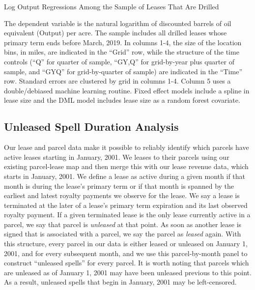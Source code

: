\begin{appendices}
	\begin{table}[H]
	\begin{center}
	\begin{threeparttable}
		\caption{Log Output Regressions Among the Sample of Leases That Are Drilled}\label{tab:outputconddrilled}
		 \small
			             
			\footnotesize
			\begin{tablenotes}
				\item The dependent variable is the natural logarithm of discounted barrels of oil equivalent (Output) per acre.  The sample includes all drilled leases whose primary term ends before March, 2019.  In columns 1-4, the size of the location bins, in miles, are indicated in the ``Grid'' row, while the structure of the time controls (``Q'' for quarter of sample, ``GY,Q'' for grid-by-year plus quarter of sample, and ``GYQ'' for grid-by-quarter of sample) are indicated in the ``Time'' row.  Standard errors are clustered by grid in columns 1-4.  Column 5 uses a double/debiased machine learning routine.  Fixed effect models include a spline in lease size and the DML model includes lease size as a random forest covariate.
			\end{tablenotes} 
	\end{threeparttable}
	\end{center}
\end{table}
\addtolength{\tabcolsep}{-10pt}

\subsection{Unleased Spell Duration Analysis}\label{app:duration}
Our lease and parcel data make it possible to reliably identify which parcels have active leases starting in January, 2001.  We leases to their parcels using our existing parcel-lease map and then merge this with our lease revenue data, which starts in January, 2001.  We define a lease as active during a given month if that month is during the lease's primary term or if that month is spanned by the earliest and latest royalty payments we observe for the lease.  We say a lease is terminated at the later of a lease's primary term expiration and its last observed royalty payment.  If a given terminated lease is the only lease currently active in a parcel, we say that parcel is \textit{unleased} at that point.  As soon as another lease is signed that is associated with a parcel, we say the parcel as \textit{leased} again.  With this structure, every parcel in our data is either leased or unleased on January 1, 2001, and for every subsequent month, and we use this parcel-by-month panel to construct ``unleased spells'' for every parcel.  It is worth noting that parcels which are unleased as of January 1, 2001 may have been unleased previous to this point.  As a result, unleased spells that begin in January, 2001 may be left-censored.  


\end{appendices}
